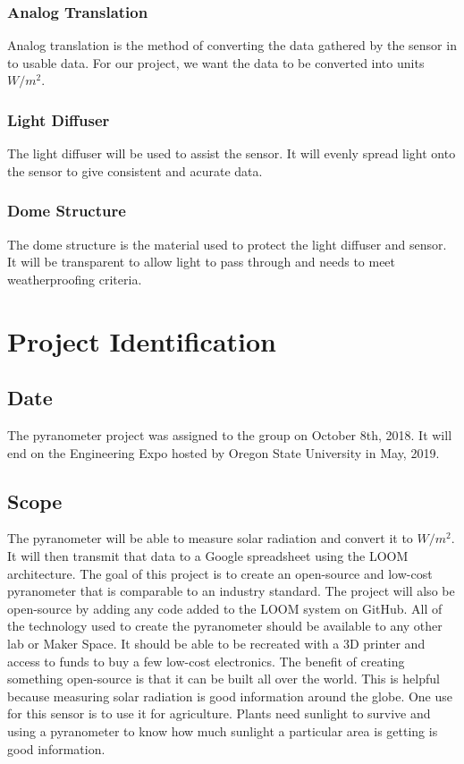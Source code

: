 \documentclass[10pt,draftclsnofoot,onecolumn,letterpaper]{article}
\begin{document}
\subsubsection{Analog Translation}
Analog translation is the method of converting the data gathered by the sensor in to usable data. For our project, we want the data to be converted into units $W/m^2$.

\subsubsection{Light Diffuser}
The light diffuser will be used to assist the sensor. It will evenly spread light onto the sensor to give consistent and acurate data.

\subsubsection{Dome Structure}
The dome structure is the material used to protect the light diffuser and sensor. It will be transparent to allow light to pass through and needs to meet weatherproofing criteria.

\section{Project Identification}
\subsection{Date}
The pyranometer project was assigned to the group on October 8th, 2018. It will end on the Engineering Expo hosted by Oregon State University in May, 2019. 

\subsection{Scope}
The pyranometer will be able to measure solar radiation and convert it to $W/m^2$. It will then transmit that data to a Google spreadsheet using the LOOM architecture. The goal of this project is to create an open-source and low-cost pyranometer that is comparable to an industry standard.  The project will also be open-source by adding any code added to the LOOM system on GitHub. All of the technology used to create the pyranometer should be available to any other lab or Maker Space. It should be able to be recreated with a 3D printer and access to funds to buy a few low-cost electronics. The benefit of creating something open-source is that it can be built all over the world. This is helpful because measuring solar radiation is good information around the globe. One use for this sensor is to use it for agriculture. Plants need sunlight to survive and using a pyranometer to know how much sunlight a particular area is getting is good information.
\end{document}
